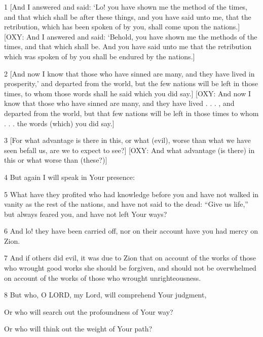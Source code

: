 \par 1 [And I answered and said: ‘Lo! you have shown me the method of the times, and that which shall be after these things, and you have said unto me, that the retribution, which has been spoken of by you, shall come upon the nations.] [OXY: And I answered and said: ‘Behold, you have shown me the methods of the times, and that which shall be. And you have said unto me that the retribution which was spoken of by you shall be endured by the nations.]

\par 2 [And now I know that those who have sinned are many, and they have lived in prosperity,’ and departed from the world, but the few nations will be left in those times, to whom those words shall he said which you did say.] [OXY: And now I know that those who have sinned are many, and they have lived . . . , and departed from the world, but that few nations will be left in those times to whom . . . the words (which) you did say.]

\par 3 [For what advantage is there in this, or what (evil), worse than what we have seen befall us, are we to expect to see?] [OXY: And what advantage (is there) in this or what worse than (these?)]

\par 4 But again I will speak in Your presence: 

\par 5 What have they profited who had knowledge before you and have not walked in vanity as the rest of the nations, and have not said to the dead: “Give us life,” but always feared you, and have not left Your ways? 

\par 6 And lo! they have been carried off, nor on their account have you had mercy on Zion. 

\par 7 And if others did evil, it was due to Zion that on account of the works of those who wrought good works she should be forgiven, and should not be overwhelmed on account of the works of those who wrought unrighteousness. 

\par 8 But who, O LORD, my Lord, will comprehend Your judgment,

\par Or who will search out the profoundness of Your way?

\par Or who will think out the weight of Your path?

